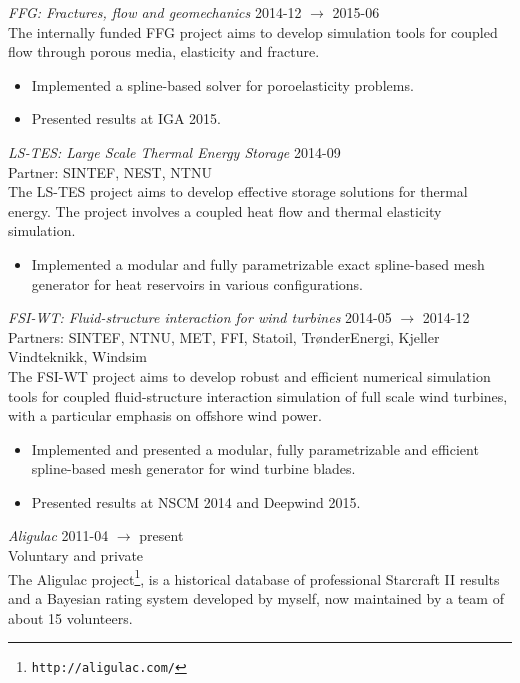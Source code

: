 \documentclass[line,margin]{res}
\begin{document}
\begin{resume}
\newpage

{\em FFG: Fractures, flow and geomechanics} \hfill 2014-12 $\to$ 2015-06 \\
The internally funded FFG project aims to develop simulation tools for coupled
flow through porous media, elasticity and fracture.
\begin{itemize}
\item Implemented a spline-based solver for poroelasticity problems.
\item Presented results at  IGA 2015.
\end{itemize}

{\em LS-TES: Large Scale Thermal Energy Storage} \hfill 2014-09 \\
{\small Partner: SINTEF, NEST, NTNU} \\
The LS-TES project aims to develop effective storage solutions for thermal
energy. The project involves a coupled heat flow and thermal elasticity
simulation.
\begin{itemize}
\item Implemented a modular and fully parametrizable exact spline-based mesh
  generator for heat reservoirs in various configurations.
\end{itemize}

{\em FSI-WT: Fluid-structure interaction for wind turbines}
\hfill 2014-05 $\to$ 2014-12 \\
{\small Partners: SINTEF, NTNU, MET, FFI, Statoil, TrønderEnergi, Kjeller Vindteknikk, Windsim} \\
The FSI-WT project aims to develop robust and efficient numerical simulation
tools for coupled fluid-structure interaction simulation of full scale wind
turbines, with a particular emphasis on offshore wind power.
\begin{itemize}
\item Implemented and presented a modular, fully parametrizable and efficient
  spline-based mesh generator for wind turbine blades.
\item Presented results at  NSCM 2014 and  Deepwind 2015.
\end{itemize}

{\em Aligulac}
\hfill 2011-04 $\to$ present \\
{\small Voluntary and private} \\
The Aligulac project\footnote{{\tt http://aligulac.com/}}, is a historical
database of professional Starcraft II results and a Bayesian rating system
developed by myself, now maintained by a team of about 15 volunteers.


\end{resume}
\end{document}
